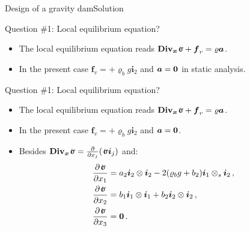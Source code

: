 \documentclass{beamer}
\newcommand{\xj}{x}
\newcommand{\xv}{{\boldsymbol\xj}}
\newcommand{\Div}{\mathbf{Div}}
\newcommand{\Divx}{{\Div_\xv}}
\renewcommand{\ij}{i}
\newcommand{\iv}{{\boldsymbol\ij}}
\newcommand{\fj}{f}
\newcommand{\fv}{{\boldsymbol\fj}}
\newcommand{\roi}{\varrho}
\newcommand{\stress}{\mbox{$\hspace{0.3em}\rotatebox[x=0pt,y=0.2pt]{90}{\rule{0.017\linewidth}{0.4pt}}\hspace{-0.25em}\upsigma$}}
\newcommand{\acj}{a}
\newcommand{\acv}{{\boldsymbol\acj}}
\newcommand{\bzero}{{\bf 0}}
\begin{document}
\begin{frame}{Design of a gravity dam}{Solution}

\begin{overprint}

\vskip-20pt
\begin{exampleblock}{Question \#1: Local equilibrium equation?}
\begin{itemize}
\item The local equilibrium equation reads $\Divx\stress+\fv_v=\roi\acv$.
\item In the present case $\fv_v=+\roi_b g\iv_2$ and $\acv=\bzero$ in static analysis.
\end{itemize}
\end{exampleblock}

\vskip-20pt
\begin{exampleblock}{Question \#1: Local equilibrium equation?}
\begin{itemize}
\item The local equilibrium equation reads $\Divx\stress+\fv_v=\roi\acv$.
\item In the present case $\fv_v=+\roi_b g\iv_2$ and $\acv=\bzero$.
\item Besides $\Divx\stress=\frac{\partial}{\partial\xj_j}(\stress\iv_j)$ and:
\begin{displaymath}
\begin{split}
\frac{\partial\stress}{\partial\xj_1}&=a_2\iv_2\otimes\iv_2-2(\roi_b g+b_2)\iv_1\otimes_s\iv_2\,, \\
\frac{\partial\stress}{\partial\xj_2} &=b_1\iv_1\otimes\iv_1+b_2\iv_2\otimes\iv_2\,, \\
\frac{\partial\stress}{\partial\xj_3} &=\bzero\,.
\end{split}
\end{displaymath}
\end{itemize}
\end{exampleblock}


\end{overprint}
\end{frame}
\end{document}
